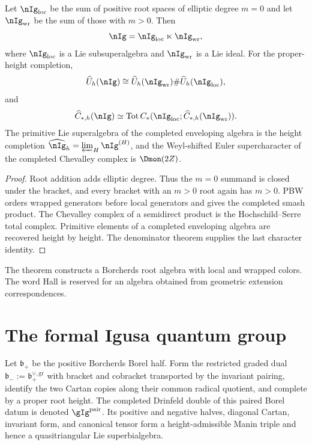 \begin{theorem}
Let $\nIg_{\loc}$ be the sum of positive root spaces of elliptic degree $m=0$ and let $\nIg_{\wrap}$ be the sum of those with $m>0$.  Then
\[
 \nIg=\nIg_{\loc}\ltimes\nIg_{\wrap},
\]
where $\nIg_{\loc}$ is a Lie subsuperalgebra and $\nIg_{\wrap}$ is a Lie ideal.  For the proper-height completion,
\[
 \widehat U_h(\nIg)
 \cong
 \widehat U_h(\nIg_{\wrap})\#\widehat U_h(\nIg_{\loc}),
\]
and
\[
 \widehat C_{*,h}(\nIg)
 \simeq
 \Tot C_*(\nIg_{\loc};\widehat C_{*,h}(\nIg_{\wrap})).
\]
The primitive Lie superalgebra of the completed enveloping algebra is the height completion $\widehat{\nIg}_h=\varprojlim_H\nIg^{(H)}$, and the Weyl-shifted Euler supercharacter of the completed Chevalley complex is $\Dmon(2Z)$.
\end{theorem}
\begin{proof}
Root addition adds elliptic degree.  Thus the $m=0$ summand is closed under the bracket, and every bracket with an $m>0$ root again has $m>0$.  PBW orders wrapped generators before local generators and gives the completed smash product.  The Chevalley complex of a semidirect product is the Hochschild--Serre total complex.  Primitive elements of a completed enveloping algebra are recovered height by height.  The denominator theorem supplies the last character identity.
\end{proof}

\begin{remark}
The theorem constructs a Borcherds root algebra with local and wrapped colors.  The word Hall is reserved for an algebra obtained from geometric extension correspondences.
\end{remark}

\chapter{The formal Igusa quantum group}
Let $\mathfrak b_+$ be the positive Borcherds Borel half.  Form the restricted graded dual $\mathfrak b_-:=\mathfrak b_+^{\vee,\mathrm{gr}}$ with bracket and cobracket transported by the invariant pairing, identify the two Cartan copies along their common radical quotient, and complete by a proper root height.  The completed Drinfeld double of this paired Borel datum is denoted $\gIg^{\mathrm{pair}}$.  Its positive and negative halves, diagonal Cartan, invariant form, and canonical tensor form a height-admissible Manin triple and hence a quasitriangular Lie superbialgebra.

